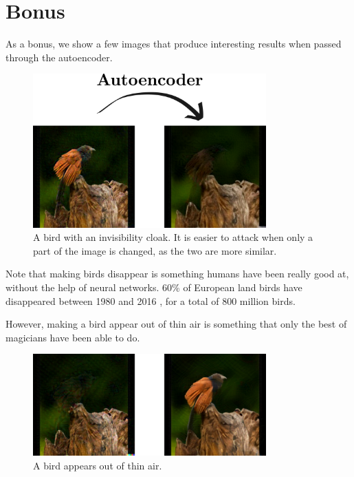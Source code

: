 \documentclass[]{scrarticle}
\begin{document}
\clearpage
\section*{Bonus}

As a bonus, we show a few images that produce interesting results when
passed through the autoencoder.

\begin{figure}[h]
  \centering
  \includegraphics[width=0.8\textwidth]{../images/bird-no-bird.png}
  \caption{
    A bird with an invisibility cloak.
    It is easier to attack when only a part of the image is changed,
    as the two are more similar.
  }
\end{figure}

Note that making birds disappear is something humans have been really good at,
without the help of neural networks.
60\% of European land birds have disappeared between 1980 and 2016
\cite{Rigal2023FarmlandPA}, for a total of 800 million birds.

However, making a bird appear out of thin air is something that
only the best of magicians have been able to do.

\begin{figure}[h]
  \centering
  \includegraphics[width=0.8\textwidth]{../images/bird-resurected.png}
  \caption{
    A bird appears out of thin air.
  }
\end{figure}







\clearpage


\end{document}
